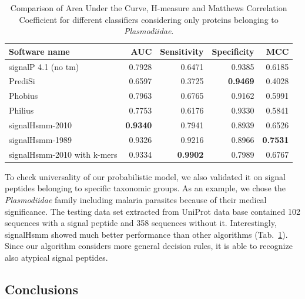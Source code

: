 \documentclass[fleqn,10pt,twoside]{gcb15submission}
\begin{document}
\begin{table}[ht]
\small
\centering
\caption{Comparison of Area Under the Curve, H-measure and Matthews Correlation Coefficient for different classifiers considering only proteins belonging to \textit{Plasmodiidae}.} 
\begin{tabular}{lrrrr}
  \toprule
Software name & AUC & Sensitivity & Specificity & MCC \\ 
  \midrule
signalP 4.1 (no tm) \citep{2011petersensignalp} & 0.7928 & 0.6471 & 0.9385 & 0.6185 \\ 
   \rowcolor[gray]{0.85}PrediSi \citep{2004hillerpredisi} & 0.6597 & 0.3725 & \textbf{0.9469} & 0.4028 \\ 
  Phobius \citep{2004klla} & 0.7963 & 0.6765 & 0.9162 & 0.5991 \\ 
   \rowcolor[gray]{0.85}Philius \citep{2008reynoldstransmembrane} & 0.7753 & 0.6176 & 0.9330 & 0.5841 \\ 
  signalHsmm-2010 & \textbf{0.9340} & 0.7941 & 0.8939 & 0.6526 \\ 
   \rowcolor[gray]{0.85}signalHsmm-1989 & 0.9326 & 0.9216 & 0.8966 & \textbf{0.7531} \\ 
  signalHsmm-2010 with k-mers & 0.9334 & \textbf{0.9902} & 0.7989 & 0.6767 \\ 
   \bottomrule
\end{tabular}
\label{tab:bench2010plas}
\end{table}

To check universality of our probabilistic model, we also validated it on signal peptides belonging to specific taxonomic groups. As an example, we chose the \textit{Plasmodiidae} family including malaria parasites because of their medical significance. The testing data set extracted from UniProt data base contained 102 sequences with a signal peptide and 358 sequences without it. Interestingly, signalHsmm showed much better performance than other algorithms (Tab.~\ref{tab:bench2010plas}). Since our algorithm considers more general decision rules, it is able to recognize also atypical signal peptides.


\subsection*{Conclusions}
\end{document}
